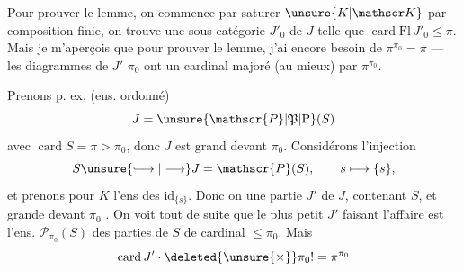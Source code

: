 Pour prouver le lemme, on commence par saturer $\unsure{K|\mathscr K}$ par composition finie, on trouve une sous-catégorie $J'_0$ de $J$ telle que $\operatorname{card}\mathrm{Fl}\,J'_0\leq\pi$. \unsure{\ldots} Mais je m'aperçois que pour prouver le lemme, j'ai encore besoin de $\pi^{\pi_0}=\pi$ ---   les diagrammes de $J'$    $\pi_0$ ont un cardinal majoré (au mieux) par $\pi^{\pi_0}$.

Prenons p. ex.  (ens. ordonné)
\[
J=\unsure{\mathscr{P}|\mathfrak{P}|\mathrm{P}}(S)
\]
avec $\operatorname{card}S=\pi>\pi_0$, donc $J$ est grand devant $\pi_0$. Considérons l'injection
\[
S\unsure{\lhook\joinrel\longrightarrow|\longrightarrow}J=\mathscr{P}(S),\qquad s\longmapsto\{s\},
\]
et prenons pour $K$  l'ens des $\mathrm{id}_{\{s\}}$. Donc on  une partie $J'$ de $J$, contenant $S$, et grande devant $\pi_0$ . On voit tout de suite que le plus petit $J'$ faisant l'affaire est l'ens. $\mathscr{P}_{\pi_0}(S)$ des parties de $S$ de cardinal $\leq\pi_0$. Mais  
\[
\operatorname{card}J'\cdot\deleted{\unsure{\times}}\pi_0!=\pi^{\pi_0}
\]
